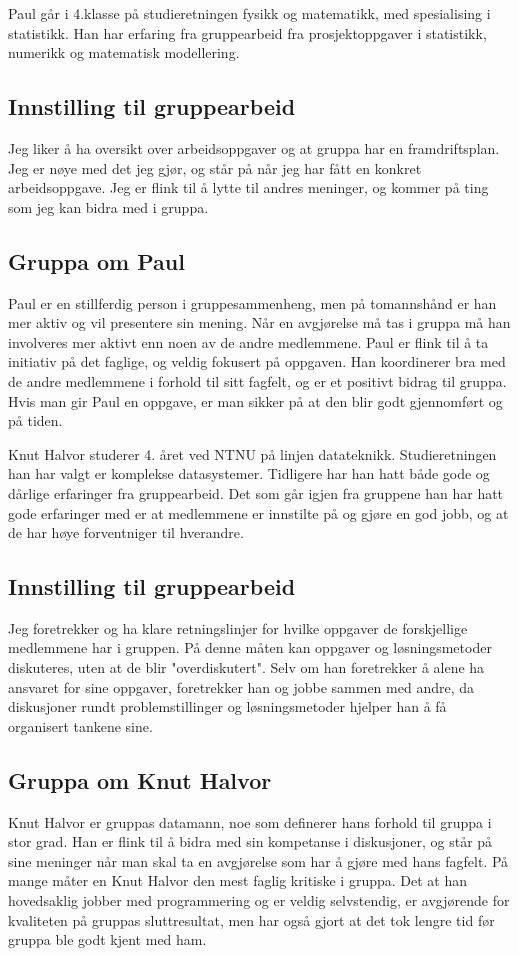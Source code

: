Paul går i 4.klasse på studieretningen fysikk og matematikk, med spesialising i statistikk. Han har erfaring fra gruppearbeid fra prosjektoppgaver i statistikk, numerikk og matematisk modellering.

\subsection*{Innstilling til gruppearbeid}
Jeg liker å ha oversikt over arbeidsoppgaver og at gruppa har en framdriftsplan. Jeg er nøye med det jeg gjør, og står på når jeg har fått en konkret arbeidsoppgave. Jeg er flink til å lytte til andres meninger, og kommer på ting som jeg kan bidra med i gruppa.

\subsection*{Gruppa om Paul}
Paul er en stillferdig person i gruppesammenheng, men på tomannshånd er han mer
aktiv og vil presentere sin mening. Når en avgjørelse må tas i gruppa må han
involveres mer aktivt enn noen av de andre medlemmene. Paul er flink til å ta 
initiativ på det faglige, og veldig fokusert på oppgaven. Han koordinerer bra 
med de andre medlemmene i forhold til sitt fagfelt, og er et positivt bidrag til
gruppa. Hvis man gir Paul en oppgave, er man sikker på at den blir godt
gjennomført og på tiden.

Knut Halvor studerer 4. året ved NTNU på linjen datateknikk. Studieretningen han 
har valgt er komplekse datasystemer. Tidligere har han hatt både gode og dårlige
erfaringer fra gruppearbeid. Det som går igjen fra gruppene han har hatt gode
erfaringer med er at medlemmene er innstilte på og gjøre en god jobb, og at de
har høye forventniger til hverandre.

\subsection*{Innstilling til gruppearbeid}
Jeg foretrekker og ha klare retningslinjer for hvilke oppgaver de forskjellige 
medlemmene har i gruppen. På denne måten kan oppgaver og løsningsmetoder diskuteres,
uten at de blir "overdiskutert". Selv om han foretrekker å alene ha ansvaret for sine oppgaver,
foretrekker han og jobbe sammen med andre, da diskusjoner rundt problemstillinger og
løsningsmetoder hjelper han å få organisert tankene sine.

\subsection*{Gruppa om Knut Halvor}
Knut Halvor er gruppas datamann, noe som definerer hans forhold til gruppa i
stor grad. Han er flink til å bidra med sin kompetanse i diskusjoner, og står på
sine meninger når man skal ta en avgjørelse som har å gjøre med hans fagfelt. På
mange måter en Knut Halvor den mest faglig kritiske i gruppa. Det at han hovedsaklig
jobber med programmering og er veldig selvstendig, er avgjørende for kvaliteten på 
gruppas sluttresultat, men har også gjort at det tok lengre tid før gruppa ble godt 
kjent med ham.

